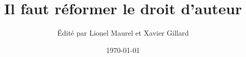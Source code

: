 \documentclass[12pt,liststotoc,bibtotoc]{scrbook}
\title{Il faut réformer le droit d'auteur}
\author{Édité par Lionel Maurel et Xavier Gillard}
\date{\today}
\theoremstyle{break}
\begin{document}
\renewcommand{\labelitemi}{$\bullet$}

\maketitle




\tableofcontents











\appendix


\end{document}
